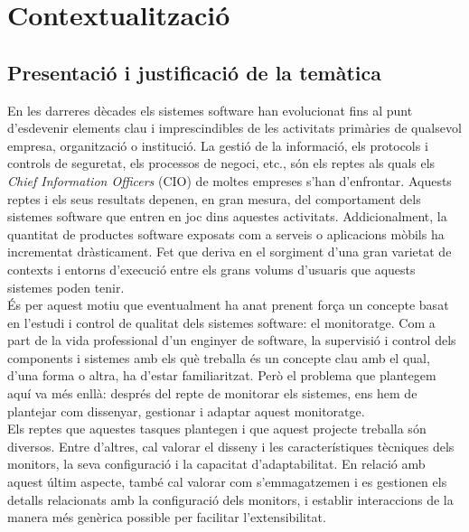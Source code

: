 \chapter{Contextualització}

\label{Contextualitzacio}

\section{Presentació i justificació de la temàtica}

En les darreres dècades els sistemes software han evolucionat fins al punt d'esdevenir elements clau i imprescindibles de les activitats primàries de qualsevol empresa, organització o institució. La gestió de la informació, els protocols i controls de seguretat, els processos de negoci, etc., són els reptes als quals els \textit{Chief Information Officers} (CIO) de moltes empreses s'han d'enfrontar. Aquests reptes i els seus resultats depenen, en gran mesura, del comportament dels sistemes software que entren en joc dins aquestes activitats. Addicionalment, la quantitat de productes software exposats com a serveis o aplicacions mòbils ha incrementat dràsticament. Fet que deriva en el sorgiment d'una gran varietat de contexts i entorns d'execució entre els grans volums d'usuaris que aquests sistemes poden tenir. \\

És per aquest motiu que eventualment ha anat prenent força un concepte basat en l'estudi i control de qualitat dels sistemes software: el monitoratge. Com a part de la vida professional d'un enginyer de software, la supervisió i control dels components i sistemes amb els què treballa és un concepte clau amb el qual, d'una forma o altra, ha d'estar familiaritzat. Però el problema que plantegem aquí va més enllà: després del repte de monitorar els sistemes, ens hem de plantejar com dissenyar, gestionar i adaptar aquest monitoratge.\\

Els reptes que aquestes tasques plantegen i que aquest projecte treballa són diversos. Entre d'altres, cal valorar el disseny i les característiques tècniques dels monitors, la seva configuració i la capacitat d'adaptabilitat. En relació amb aquest últim aspecte, també cal valorar com s'emmagatzemen i es gestionen els detalls relacionats amb la configuració dels monitors, i establir interaccions de la manera més genèrica possible per facilitar l'extensibilitat.\\

